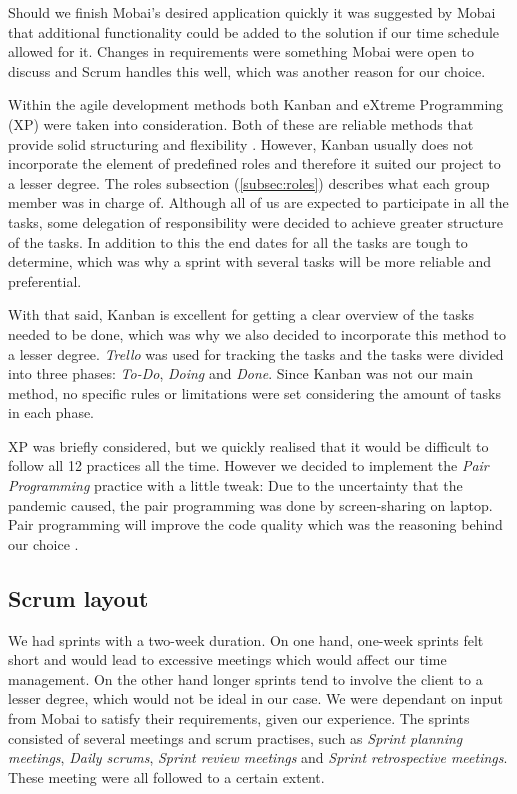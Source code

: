 Should we finish Mobai's desired application quickly it was suggested by Mobai that additional functionality could be added to the solution if our time schedule allowed for it. Changes in requirements were something Mobai were open to discuss and Scrum handles this well, which was another reason for our choice.

Within the agile development methods both Kanban and eXtreme Programming (XP) were taken into consideration. Both of these are reliable methods that provide solid structuring and flexibility \cite{KanbanVScrum}. However, Kanban usually does not incorporate the element of predefined roles and therefore it suited our project to a lesser degree. The roles subsection (\ref{subsec:roles}) describes what each group member was in charge of. Although all of us are expected to participate in all the tasks, some delegation of responsibility were decided to achieve greater structure of the tasks. In addition to this the end dates for all the tasks are tough to determine, which was why a sprint with several tasks will be more reliable and preferential. 

With that said, Kanban is excellent for getting a clear overview of the tasks needed to be done, which was why we also decided to incorporate this method to a lesser degree. \textit{Trello}\cite{Trello} was used for tracking the tasks and the tasks were divided into three phases: \textit{To-Do}, \textit{Doing} and \textit{Done}. Since Kanban was not our main method, no specific rules or limitations were set considering the amount of tasks in each phase. 

XP was briefly considered, but we quickly realised that it would be difficult to follow all 12 practices all the time. However we decided to implement the \textit{Pair Programming} practice with a little tweak: Due to the uncertainty that the pandemic caused, the pair programming was done by screen-sharing on laptop. Pair programming will improve the code quality which was the reasoning behind our choice \cite{eXtremeP}. 

\subsection{Scrum layout}
We had sprints with a two-week duration. On one hand, one-week sprints felt short and would lead to excessive meetings which would affect our time management. On the other hand longer sprints tend to involve the client to a lesser degree, which would not be ideal in our case. We were dependant on input from Mobai to satisfy their requirements, given our experience. The sprints consisted of several meetings and scrum practises, such as \textit{Sprint planning meetings}, \textit{Daily scrums}, \textit{Sprint review meetings} and \textit{Sprint retrospective meetings}. These meeting were all followed to a certain extent. 

